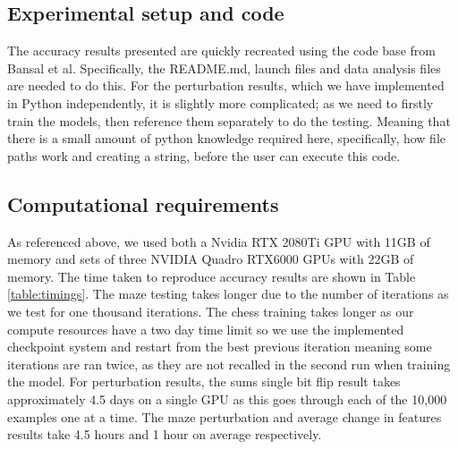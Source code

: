 \subsection{Experimental setup and code}
The accuracy results presented are quickly recreated using the code base from Bansal et al. Specifically, the README.md, launch files and data analysis files are needed to do this. 
For the perturbation results, which we have implemented in Python independently, it is slightly more complicated; as we need to firstly train the models, then reference them separately to do the testing. Meaning that there is a small amount of python knowledge required here, specifically, how file paths work and creating a string, before the user can execute this code.

\subsection{Computational requirements}
As referenced above, we used both a Nvidia RTX 2080Ti GPU with 11GB of memory and sets of three NVIDIA Quadro RTX6000 GPUs with 22GB of memory. The time taken to reproduce accuracy results are shown in Table \ref{table:timings}. The maze testing takes longer due to the number of iterations as we test for one thousand iterations. The chess training takes longer as our compute resources have a two day time limit so we use the implemented checkpoint system and restart from the best previous iteration meaning some iterations are ran twice, as they are not recalled in the second run when training the model. For perturbation results, the sums single bit flip result takes approximately 4.5 days on a single GPU as this goes through each of the 10,000 examples one at a time. The maze perturbation and average change in features results take 4.5 hours and 1 hour on average respectively.

